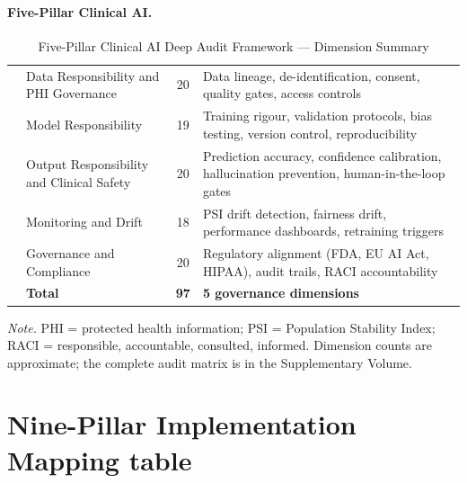 \paragraph{Five-Pillar Clinical AI.}




{\tablestripes\tablefontsize

\begin{xltabular}{\textwidth}{@{}c L c L@{}}
\caption[Five-Pillar Clinical AI Deep Audit Framework]{Five-Pillar Clinical AI Deep Audit Framework --- Dimension Summary}\label{tab:app_ch5_audit_pillars} \\
\toprule
{} &  &  &  \\
\midrule
\endfirsthead
\endhead
\bottomrule
{} & Data Responsibility and PHI Governance & 20 & Data lineage, de-identification, consent, quality gates, access controls \\
 & Model Responsibility & 19 & Training rigour, validation protocols, bias testing, version control, reproducibility \\
 & Output Responsibility and Clinical Safety & 20 & Prediction accuracy, confidence calibration, hallucination prevention, human-in-the-loop gates \\
 & Monitoring and Drift & 18 & PSI drift detection, fairness drift, performance dashboards, retraining triggers \\
 & Governance and Compliance & 20 & Regulatory alignment (FDA, EU AI Act, HIPAA), audit trails, RACI accountability \\
\midrule
 & \textbf{Total} & \textbf{97} & \textbf{5 governance dimensions} \\
\end{xltabular}}
\vspace{0.5em}\noindent\textit{Note.} PHI = protected health information; PSI = Population Stability Index; RACI = responsible, accountable, consulted, informed. Dimension counts are approximate; the complete audit matrix is in the Supplementary Volume.

\iffalse
\clearpage
\section{Nine-Pillar Implementation Mapping table}
\label{sec:appendix_ch5_s2}

